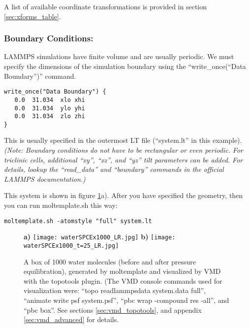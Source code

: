 \documentclass[11pt]{article}
\begin{document}
A list of available coordinate transformations 
is provided in section \ref{sec:xforms_table}.

\subsubsection*{Boundary Conditions:}
\label{sec:pbc}
LAMMPS simulations have finite volume and are usually periodic. 
We must specify the dimensions of the simulation boundary 
using the ``write\_once(``Data Boundary'')'' command.  
\begin{verbatim}
write_once("Data Boundary") {
   0.0  31.034  xlo xhi
   0.0  31.034  ylo yhi
   0.0  31.034  zlo zhi
}
\end{verbatim}
This is usually specified in the outermost LT file 
(``system.lt'' in this example).
\textit{(Note: Boundary conditions do not have to be rectangular 
or even periodic.  For triclinic cells, additional 
``xy'', ``xz'', and ``yz'' tilt parameters can be added.
For details, lookup the ``read\_data'' and ``boundary'' 
commands in the official LAMMPS documentation.)}

This system is shown in figure \ref{fig:spce_x_1000}a).
After you have specified the geometry, 
then you can run moltemplate.sh this way:
\begin{verbatim}
moltemplate.sh -atomstyle "full" system.lt
\end{verbatim}

\begin{figure}[htbp]
\centering
\textbf{a)}
\texttt{[image: waterSPCEx1000\_LR.jpg]}
\textbf{b)}
\texttt{[image: waterSPCEx1000\_t=25\_LR.jpg]}
\caption{
\label{fig:spce_x_1000}
A box of 1000 water molecules (before and after pressure equilibration), 
generated by moltemplate and visualized by VMD with the topotools plugin.
(The VMD console commands used for visualization were:
``topo readlammpsdata system.data full'',
``animate write psf system.psf'',
``pbc wrap -compound res -all'', and 
``pbc box''.
See sections \ref{sec:vmd_topotools}, and appendix \ref{sec:vmd_advanced}
for details.
}
\end{figure}
\end{document}
